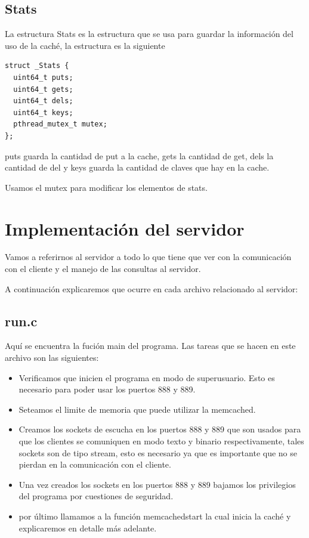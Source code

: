 \documentclass{article}
\begin{document}
\subsection{Stats}
La estructura Stats es la estructura que se usa para guardar
la información del uso de la caché, la estructura es la siguiente

\begin{lstlisting}[style=CStyle]
struct _Stats {
  uint64_t puts;
  uint64_t gets;
  uint64_t dels;
  uint64_t keys;
  pthread_mutex_t mutex;
}; 
\end{lstlisting}
puts guarda la cantidad de put a la cache, gets la cantidad
de get, dels la cantidad de del y keys guarda la cantidad
de claves que hay en la cache.

Usamos el mutex para modificar los elementos de stats.


\section{Implementación del servidor}
Vamos a referirnos al servidor a todo lo que tiene que ver con
la comunicación con el cliente y el manejo de las consultas
al servidor.

A continuación explicaremos que ocurre en cada archivo relacionado
al servidor:

\subsection{run.c}
Aquí se encuentra la fución main del programa. Las tareas
que se hacen en este archivo son las siguientes:
\begin{itemize}
    \item Verificamos que inicien el programa en modo de
    superusuario. Esto es necesario para poder usar los
    puertos 888 y 889.
    \item Seteamos el limite de memoria que puede utilizar
    la memcached.
    \item Creamos los sockets de escucha en los puertos
    888 y 889 que son usados para que los clientes se
    comuniquen en modo texto y binario respectivamente,
    tales sockets son de tipo stream, esto es necesario
    ya que es importante que no se pierdan en la
    comunicación con el cliente.
    \item Una vez creados los sockets en los puertos 888
    y 889 bajamos los privilegios del programa por cuestiones
    de seguridad.
    \item por último llamamos a la función 
    memcached\textunderscore start la cual inicia la caché
    y explicaremos en detalle más adelante.
\end{itemize}
\end{document}
